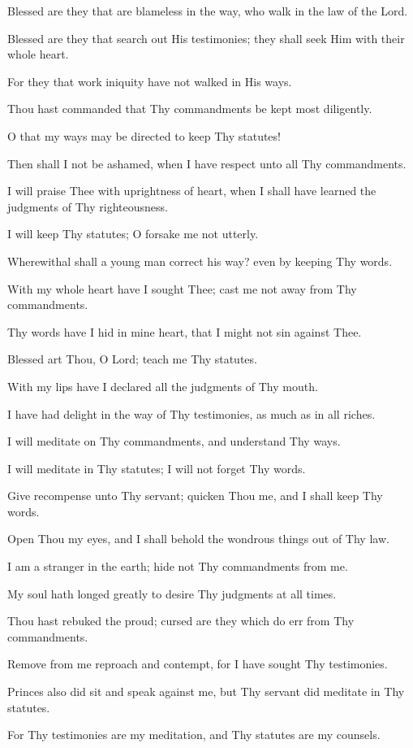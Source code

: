 Blessed are they that are blameless in the way, who walk in
the law of the Lord.

Blessed are they that search out His testimonies; they shall
seek Him with their whole heart.

For they that work iniquity have not walked in His ways.

Thou hast commanded that Thy commandments be kept most
diligently.

O that my ways may be directed to keep Thy statutes!

Then shall I not be ashamed, when I have respect unto all Thy
commandments.

I will praise Thee with uprightness of heart, when I shall have
learned the judgments of Thy righteousness.

I will keep Thy statutes; O forsake me not utterly.

Wherewithal shall a young man correct his way? even by
keeping Thy words.

With my whole heart have I sought Thee; cast me not away
from Thy commandments.

Thy words have I hid in mine heart, that I might not sin
against Thee.

Blessed art Thou, O Lord; teach me Thy statutes.

With my lips have I declared all the judgments of Thy mouth.

I have had delight in the way of Thy testimonies, as much as
in all riches.

I will meditate on Thy commandments, and understand Thy
ways.

I will meditate in Thy statutes; I will not forget Thy words.

Give recompense unto Thy servant; quicken Thou me, and I
shall keep Thy words.

Open Thou my eyes, and I shall behold the wondrous things
out of Thy law.

I am a stranger in the earth; hide not Thy commandments
from me.

My soul hath longed greatly to desire Thy judgments at all
times.

Thou hast rebuked the proud; cursed are they which do err
from Thy commandments.

Remove from me reproach and contempt, for I have sought
Thy testimonies.

Princes also did sit and speak against me, but Thy servant did
meditate in Thy statutes.

For Thy testimonies are my meditation, and Thy statutes are
my counsels.

